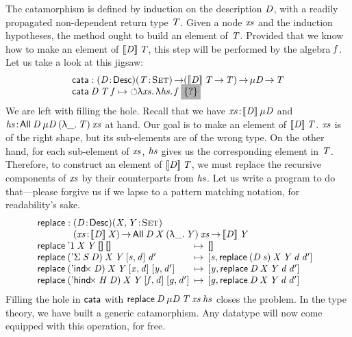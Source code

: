 The catamorphism is defined by induction on the description $\V{D}$,
with a readily propagated non-dependent return type $\V{T}$.
Given a node $\V{xs}$
and the induction hypotheses, the method ought to build an element of
$\V{T}$. Provided that we know how to make an element of
$\descop{\V{D}}{\V{T}}$, this step will be performed by the algebra
$\V{f}$. Let us take a look at this jigsaw:
%
\[\stk{
\cata : \PITEL{\V{D}}{\Desc}
           \PI{\V{T}}{\Set}
           (\descop{\V{D}}{\V{T}} \To \V{T}) \To 
           \Mu{\V{D}} \To \V{T} \\
\cata\: \V{D}\: \V{T}\: \V{f} \mapsto
  \sind \LAM{\V{xs}}\LAM{\V{hs}} \V{f}\: \SHED
}\]
% 
We are left with filling the hole. Recall that we have
\(\Bhab{\V{xs}}{\descop{\V{D}}{\Mu{\V{D}}}}\) and
\(\Bhab{\V{hs}}{\All{\V{D}}{\Mu{\V{D}}}{(\LAM{\_} \V{T})}{\V{xs}}}\)
at hand. Our goal is to make an element of
\(\descop{\V{D}}{\V{T}}\). $\V{xs}$ is of the right shape, but its
sub-elements are of the wrong type. On the other hand, for each
sub-element of $\V{xs}$, $\V{hs}$ gives us the corresponding element
in $\V{T}$.  Therefore, to construct an element of
\(\descop{\V{D}}{\V{T}}\), we must replace the recursive components of
\(\V{xs}\) by their counterparts from \(\V{hs}\). Let us write a
program to do that---please forgive us if we lapse to a pattern
matching notation, for readability's sake.
%
\[\stk{
\F{replace} : \stk{\PITEL{\V{D}}{\Desc}
                   \PITEL{\V{X},\V{Y}}{\Set}\\
                   \PI{\V{xs}}{\descop{\V{D}}{\V{X}}} 
                   \All{\V{D}}{\V{X}}{(\LAM{\_}\V{Y})}{\V{xs}} \To
                   \descop{\V{D}}{\V{Y}}} \\
\begin{array}{@{}l@{\:\:\mapsto\:\:}l}
\F{replace}\: \DUnit\:          \V{X}\: \V{Y}\: \Void\:          \Void   &
    \Void  \\
\F{replace}\: (\DSigma{\V{S}}{\V{D}})\: \V{X}\: \V{Y}\: \pair{\V{s}}{\V{d}}{}\: \V{d'}  &
    \pair{\V{s}}{\F{replace}\: (\V{D}\: \V{s})\: \V{X}\: \V{Y}\: \V{d}\: \V{d'}}{} \\
\F{replace}\: (\DIndx{\V{D}})\:     \V{X}\: \V{Y}\: \pair{\V{x}}{\V{d}}{}\: \pair{\V{y}}{\V{d'}}{} &
    \pair{\V{y}}{\F{replace}\: \V{D}\: \V{X}\: \V{Y}\: \V{d}\: \V{d'}}{} \\
\F{replace}\: (\DHindx{\V{H}}{\V{D}})\: \V{X}\: \V{Y}\: \pair{\V{f}}{\V{d}}{}\: \pair{\V{g}}{\V{d'}}{} &
 \pair{\V{g}}{\F{replace}\: \V{D}\: \V{X}\: \V{Y}\: \V{d}\: \V{d'}}{}
\end{array}
}\]
%
Filling the hole in $\F{cata}$ with \(\F{replace}\: \V{D}\:
\Mu{\V{D}}\: \V{T}\: \V{xs}\: \V{hs}\) closes the problem. In the
type theory, we have built a generic catamorphism. Any datatype will
now come equipped with this operation, for free.

